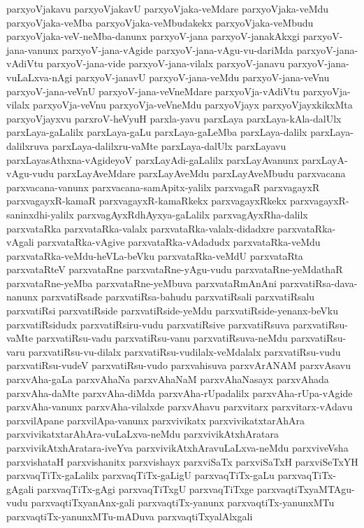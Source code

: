 {parxyoVjakavu
parxyoVjakavU
parxyoVjaka-veMdare
parxyoVjaka-veMdu
parxyoVjaka-veMba
parxyoVjaka-veMbudakekx
parxyoVjaka-veMbudu
parxyoVjaka-veV-neMba-danunx
parxyoV-jana
parxyoV-janakAkxgi
parxyoV-jana-vanunx
parxyoV-jana-vAgide
parxyoV-jana-vAgu-vu-dariMda
parxyoV-jana-vAdiVtu
parxyoV-jana-vide
parxyoV-jana-vilalx
parxyoV-janavu
parxyoV-jana-vuLaLxva-nAgi
parxyoV-janavU
parxyoV-jana-veMdu
parxyoV-jana-veVnu
parxyoV-jana-veVnU
parxyoV-jana-veVneMdare
parxyoVja-vAdiVtu
parxyoVja-vilalx
parxyoVja-veVnu
parxyoVja-veVneMdu
parxyoVjayx
parxyoVjayxkikxMta
parxyoVjayxvu
parxroV-heVyuH
parxla-yavu
parxLaya
parxLaya-kAla-dalUlx
parxLaya-gaLalilx
parxLaya-gaLu
parxLaya-gaLeMba
parxLaya-dalilx
parxLaya-dalilxruva
parxLaya-dalilxru-vaMte
parxLaya-dalUlx
parxLayavu
parxLayasAthxna-vAgideyoV
parxLayAdi-gaLalilx
parxLayAvanunx
parxLayA-vAgu-vudu
parxLayAveMdare
parxLayAveMdu
parxLayAveMbudu
parxvacana
parxvacana-vanunx
parxvacana-samApitx-yalilx
parxvagaR
parxvagayxR
parxvagayxR-kamaR
parxvagayxR-kamaRkekx
parxvagayxRkekx
parxvagayxR-saninxdhi-yalilx
parxvagAyxRdhAyxya-gaLalilx
parxvagAyxRha-dalilx
parxvataRka
parxvataRka-valalx
parxvataRka-valalx-didadxre
parxvataRka-vAgali
parxvataRka-vAgive
parxvataRka-vAdadudx
parxvataRka-veMdu
parxvataRka-veMdu-heVLa-beVku
parxvataRka-veMdU
parxvataRta
parxvataRteV
parxvataRne
parxvataRne-yAgu-vudu
parxvataRne-yeMdathaR
parxvataRne-yeMba
parxvataRne-yeMbuva
parxvataRmAnAni
parxvatiRsa-dava-nanunx
parxvatiRsade
parxvatiRsa-bahudu
parxvatiRsali
parxvatiRsalu
parxvatiRsi
parxvatiRside
parxvatiRside-yeMdu
parxvatiRside-yenanx-beVku
parxvatiRsidudx
parxvatiRsiru-vudu
parxvatiRsive
parxvatiRsuva
parxvatiRsu-vaMte
parxvatiRsu-vadu
parxvatiRsu-vanu
parxvatiRsuva-neMdu
parxvatiRsu-varu
parxvatiRsu-vu-dilalx
parxvatiRsu-vudilalx-veMdalalx
parxvatiRsu-vudu
parxvatiRsu-vudeV
parxvatiRsu-vudo
parxvahisuva
parxvArANAM
parxvAsavu
parxvAha-gaLa
parxvAhaNa
parxvAhaNaM
parxvAhaNasayx
parxvAhada
parxvAha-daMte
parxvAha-diMda
parxvAha-rUpadalilx
parxvAha-rUpa-vAgide
parxvAha-vanunx
parxvAha-vilalxde
parxvAhavu
parxvitarx
parxvitarx-vAdavu
parxvilApane
parxvilApa-vanunx
parxvivikatx
parxvivikatxtarAhAra
parxvivikatxtarAhAra-vuLaLxva-neMdu
parxvivikAtxhAratara
parxvivikAtxhAratara-iveYva
parxvivikAtxhAravuLaLxva-neMdu
parxviveVsha
parxvishataH
parxvishanitx
parxvishayx
parxviSaTx
parxviSaTxH
parxviSeTxYH
parxvaqTiTx-gaLalilx
parxvaqTiTx-gaLigU
parxvaqTiTx-gaLu
parxvaqTiTx-gAgali
parxvaqTiTx-gAgi
parxvaqTiTxgU
parxvaqTiTxge
parxvaqtiTxyaMTAgu-vudu
parxvaqtiTxyanAnx-gali
parxvaqtiTx-yanunx
parxvaqtiTx-yanunxMTu
parxvaqtiTx-yanunxMTu-mADuva
parxvaqtiTxyalAlxgali
}
